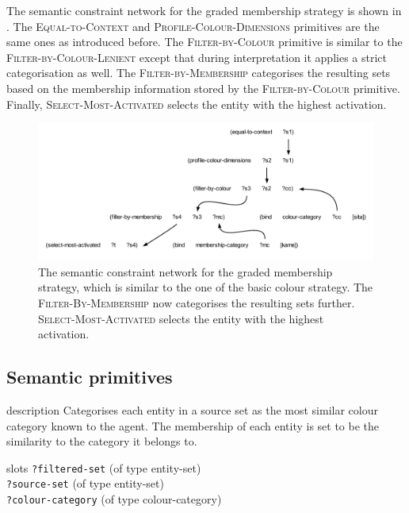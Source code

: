 The semantic constraint network for the graded membership
  strategy is shown in . The
\textsc{Equal-to-Context} and \textsc{Profile-Colour-Dimensions}
primitives are the same ones as introduced before. The
\textsc{Filter-by-Colour} primitive is similar to the
\textsc{Filter-by-Colour-Lenient} except that during interpretation it
applies a strict categorisation as well. The
\textsc{Filter-by-Membership} categorises the resulting sets based on
the membership information stored by the \textsc{Filter-by-Colour}
primitive. Finally, \textsc{Select-Most-Activated} selects the entity
with the highest activation.

\begin{figure}[htbp]
  \centering
  \includegraphics[width=\textwidth]{./graded-membership/figures/semantic-program.pdf}
  \caption[The semantic constraint network for the graded membership
  strategy]{The semantic constraint network for the graded membership
    strategy, which is similar to the one of the basic colour
    strategy. The \textsc{Filter-By-Membership} now categorises the
    resulting sets further. \textsc{Select-Most-Activated} selects the
    entity with the highest activation.}
  \label{f:gms-semantic-program}
\end{figure}

\subsection{Semantic primitives}


\begin{explanation}{description}
  Categorises each entity in a source set as the most similar colour
  category known to the agent. The membership of each entity is set to
  be the similarity to the category it belongs to.
\end{explanation}

\begin{explanation}{slots}
  \verb+?filtered-set+ (of type entity-set) \\
  \verb+?source-set+ (of type entity-set) \\
  \verb+?colour-category+ (of type colour-category)
\end{explanation}

